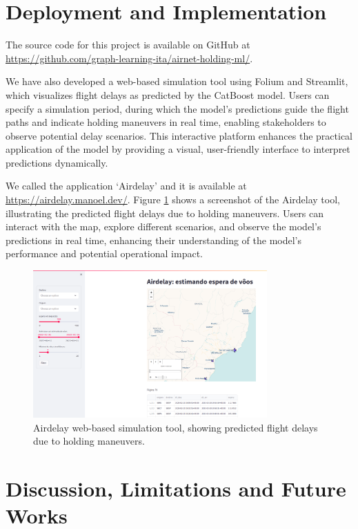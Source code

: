 \section{Deployment and Implementation}

The source code for this project is available on GitHub at \href{https://github.com/graph-learning-ita/airnet-holding-ml/}{https://github.com/graph-learning-ita/airnet-holding-ml/}.

We have also developed a web-based simulation tool using Folium and Streamlit, which visualizes flight delays as predicted by the CatBoost model. Users can specify a simulation period, during which the model's predictions guide the flight paths and indicate holding maneuvers in real time, enabling stakeholders to observe potential delay scenarios. This interactive platform enhances the practical application of the model by providing a visual, user-friendly interface to interpret predictions dynamically.

We called the application `Airdelay' and it is available at \href{https://airdelay.manoel.dev/}{https://airdelay.manoel.dev/}. Figure \ref{fig:airdelay} shows a screenshot of the Airdelay tool, illustrating the predicted flight delays due to holding maneuvers. Users can interact with the map, explore different scenarios, and observe the model's predictions in real time, enhancing their understanding of the model's performance and potential operational impact.

\begin{figure}
    \centering
    \includegraphics[width=0.8\textwidth]{img/airdelay.png}
    \caption{Airdelay web-based simulation tool, showing predicted flight delays due to holding maneuvers.}
    \label{fig:airdelay}
\end{figure}

\section{Discussion, Limitations and Future Works}

